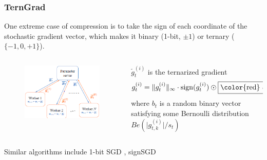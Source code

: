 \begin{frame}
\frametitle{TernGrad}

One extreme case of compression is to take the {\color{red}sign} of each coordinate of the stochastic gradient vector, which makes it binary (1-bit, $\pm 1$) or ternary ($\{-1, 0, +1\}$).

\vspace{0.4em}

\begin{columns}
\begin{column}{0.44\textwidth}
\begin{figure}
    \centering
    \includegraphics[width=1\textwidth,keepaspectratio]{images/terngrad.png}
\end{figure}
\end{column}
\begin{column}{0.52\textwidth}
$\widetilde{g}_t^{(i)}$ is the {\color{red}ternarized} gradient
$$g_t^{(i)} = \lVert g_t^{(i)} \rVert_{\infty} \cdot \operatorname{sign}(g_t^{(i)}) \odot \framebox{\color{red} $b_t$}$$
where $b_t$ is a random binary vector satisfying some Bernoulli distribution $Be(\lvert g_{t,k}^{(i)} \rvert / s_t)$
\end{column}
\end{columns}

\vspace{0.4em}

Similar algorithms include 1-bit SGD \cite{seide2014_1bitsgd}, signSGD \cite{bernstein2018signsgd}


\end{frame}

